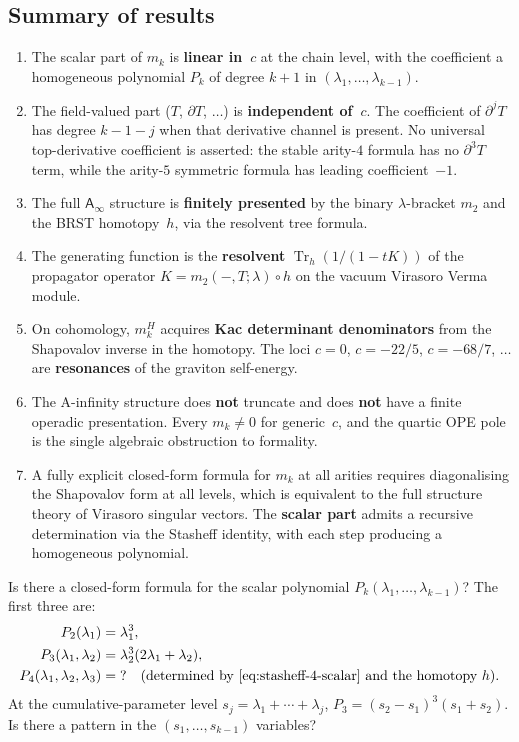 \documentclass[11pt]{article}
\newcommand{\Ainf}{\mathsf{A}_{\infty}}
\newcommand{\Tr}{\operatorname{Tr}}
\begin{document}
\subsection*{Summary of results}

\begin{enumerate}
\item The scalar part of $m_k$ is \textbf{linear in~$c$}
  at the chain level, with the coefficient a homogeneous
  polynomial $P_k$ of degree $k+1$ in
  $(\lambda_1, \ldots, \lambda_{k-1})$.
\item The field-valued part ($T$, $\partial T$, $\ldots$)
  is \textbf{independent of~$c$}.  The coefficient of
  $\partial^j T$ has degree $k-1-j$ when that derivative channel
  is present.  No universal top-derivative coefficient is asserted:
  the stable arity-$4$ formula has no $\partial^3T$ term, while
  the arity-$5$ symmetric formula has leading coefficient~$-1$.
\item The full $\Ainf$ structure is \textbf{finitely presented}
  by the binary $\lambda$-bracket $m_2$ and the BRST homotopy~$h$,
  via the resolvent tree formula.
\item The generating function is the \textbf{resolvent}
  $\Tr_h(1/(1-tK))$ of the propagator operator $K = m_2(-,T;\lambda) \circ h$
  on the vacuum Virasoro Verma module.
\item On cohomology, $m_k^H$ acquires \textbf{Kac determinant
  denominators} from the Shapovalov inverse in the homotopy.
  The loci $c = 0$, $c = -22/5$, $c = -68/7$, $\ldots$ are
  \textbf{resonances} of the graviton self-energy.
\item The A-infinity structure does \textbf{not} truncate and
  does \textbf{not} have a finite operadic presentation.
  Every $m_k \ne 0$ for generic~$c$, and the quartic
  OPE pole is the single algebraic obstruction to formality.
\item A fully explicit closed-form formula for $m_k$ at all
  arities requires diagonalising the Shapovalov form at all
  levels, which is equivalent to the full structure theory of
  Virasoro singular vectors.  The \textbf{scalar part} admits a
  recursive determination via the Stasheff identity, with each
  step producing a homogeneous polynomial.
\end{enumerate}

\begin{question}[Explicit $P_k$]\label{q:explicit-pk-wn}
Is there a closed-form formula for the scalar polynomial
$P_k(\lambda_1, \ldots, \lambda_{k-1})$?  The first three are:
\begin{align*}
P_2(\lambda_1) &= \lambda_1^3, \\
P_3(\lambda_1,\lambda_2) &= \lambda_2^3(2\lambda_1 + \lambda_2), \\
P_4(\lambda_1,\lambda_2,\lambda_3) &= \;?\quad
  \text{\textup{(}}
  \text{determined by~\eqref{eq:stasheff-4-scalar} and the homotopy~$h$}
  \text{\textup{)}}.
\end{align*}
At the cumulative-parameter level $s_j = \lambda_1 + \cdots + \lambda_j$,
$P_3 = (s_2 - s_1)^3(s_1 + s_2)$.  Is there a pattern in the
$(s_1, \ldots, s_{k-1})$ variables?
\end{question}
\end{document}
